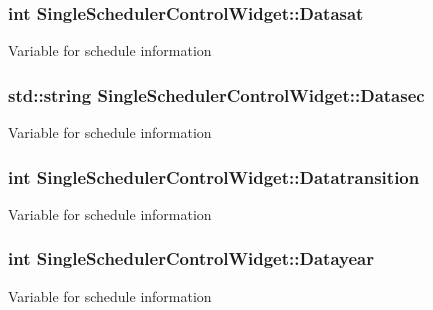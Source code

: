 \subsubsection[{\texorpdfstring{Datasat}{Datasat}}]{\setlength{\rightskip}{0pt plus 5cm}int Single\+Scheduler\+Control\+Widget\+::\+Datasat\hspace{0.3cm}{\ttfamily [private]}}\hypertarget{classSingleSchedulerControlWidget_ad21d4f657354f00e2c14b55cae4c876d}{}\label{classSingleSchedulerControlWidget_ad21d4f657354f00e2c14b55cae4c876d}
Variable for schedule information 
\subsubsection[{\texorpdfstring{Datasec}{Datasec}}]{\setlength{\rightskip}{0pt plus 5cm}std\+::string Single\+Scheduler\+Control\+Widget\+::\+Datasec\hspace{0.3cm}{\ttfamily [private]}}\hypertarget{classSingleSchedulerControlWidget_a5b662da906b80bb884245b96fc23dd68}{}\label{classSingleSchedulerControlWidget_a5b662da906b80bb884245b96fc23dd68}
Variable for schedule information 
\subsubsection[{\texorpdfstring{Datatransition}{Datatransition}}]{\setlength{\rightskip}{0pt plus 5cm}int Single\+Scheduler\+Control\+Widget\+::\+Datatransition\hspace{0.3cm}{\ttfamily [private]}}\hypertarget{classSingleSchedulerControlWidget_afc9b8081291095f9e6fdb1a9a048a2ba}{}\label{classSingleSchedulerControlWidget_afc9b8081291095f9e6fdb1a9a048a2ba}
Variable for schedule information 
\subsubsection[{\texorpdfstring{Datayear}{Datayear}}]{\setlength{\rightskip}{0pt plus 5cm}int Single\+Scheduler\+Control\+Widget\+::\+Datayear\hspace{0.3cm}{\ttfamily [private]}}\hypertarget{classSingleSchedulerControlWidget_aef67a4f23fd8f100efb80e23c56c231b}{}\label{classSingleSchedulerControlWidget_aef67a4f23fd8f100efb80e23c56c231b}
Variable for schedule information 
